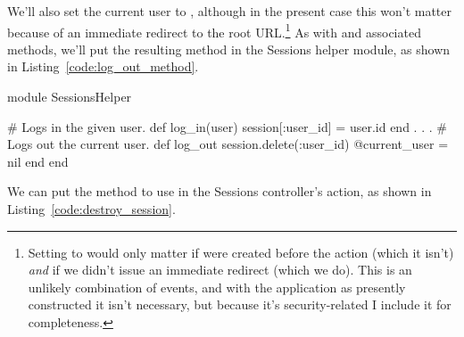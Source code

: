 \noindent We'll also set the current user to , although in the present case this won't matter because of an immediate redirect to the root URL.\footnote{Setting  to  would only matter if  were created before the  action (which it isn't) \emph{and} if we didn't issue an immediate redirect (which we do). This is an unlikely combination of events, and with the application as presently constructed it isn't necessary, but because it's security-related I include it for completeness.} As with  and associated methods, we'll put the resulting  method in the Sessions helper module, as shown in Listing~\ref{code:log_out_method}.

\begin{codelisting}
\label{code:log_out_method}
\begin{code}
module SessionsHelper

  # Logs in the given user.
  def log_in(user)
    session[:user_id] = user.id
  end
  .
  .
  .
  # Logs out the current user.
  def log_out
    session.delete(:user_id)
    @current_user = nil
  end
end
\end{code}
\end{codelisting}

We can put the  method to use in the Sessions controller's  action, as shown in Listing~\ref{code:destroy_session}.

